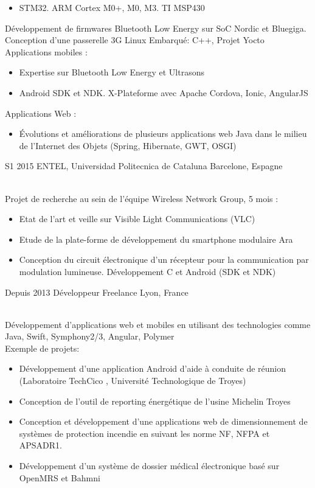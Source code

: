 \documentclass[]{cv-style}          %
\begin{document}
\begin{entrylist}
{\begin{itemize}
    \item STM32. ARM Cortex M0+, M0, M3. TI MSP430
  \end{itemize}
  Développement de firmwares Bluetooth Low Energy sur SoC Nordic et Bluegiga.\\
  Conception d'une passerelle 3G Linux Embarqué: C++, Projet Yocto\\
  Applications mobiles :
  \begin{itemize}
    \item Expertise sur Bluetooth Low Energy et Ultrasons
    \item Android SDK et NDK. X-Plateforme avec Apache Cordova, Ionic, AngularJS
  \end{itemize}
  Applications Web :
  \begin{itemize}
    \item Évolutions et améliorations de plusieurs applications web Java dans le milieu de l'Internet des Objets (Spring, Hibernate, GWT, OSGI)
  \end{itemize}}
 \entry
  {S1 2015 }
  {ENTEL, Universidad Politecnica de Cataluna}
  {Barcelone, Espagne}
  {\\
  Projet de recherche au sein de l'équipe Wireless Network Group, 5 mois :
  \begin{itemize}
    \item Etat de l'art et veille sur Visible Light Communications (VLC)
    \item Etude de la plate-forme de développement du smartphone modulaire Ara
    \item Conception du circuit électronique d'un récepteur pour la communication par modulation lumineuse. Développement C et Android (SDK et NDK)
  \end{itemize}}
\entry
  {Depuis 2013}
  {Développeur Freelance}
  {Lyon, France}
  {\\
  Développement d'applications web et mobiles en utilisant des technologies comme Java, Swift, Symphony2/3, Angular, Polymer\\
  Exemple de projets:
  \begin{itemize}
    \item Développement d'une application Android d'aide à conduite de réunion \\ (Laboratoire TechCico , Université Technologique de Troyes)
    \item Conception de l’outil de reporting énergétique de l'usine Michelin Troyes
    \item Conception et développement d'une applications web de dimensionnement de systèmes de protection incendie en suivant les norme NF, NFPA et APSADR1.
    \item Développement d'un système de dossier médical électronique basé sur OpenMRS et Bahmni
  \end{itemize}}
\end{entrylist}
\end{document}
